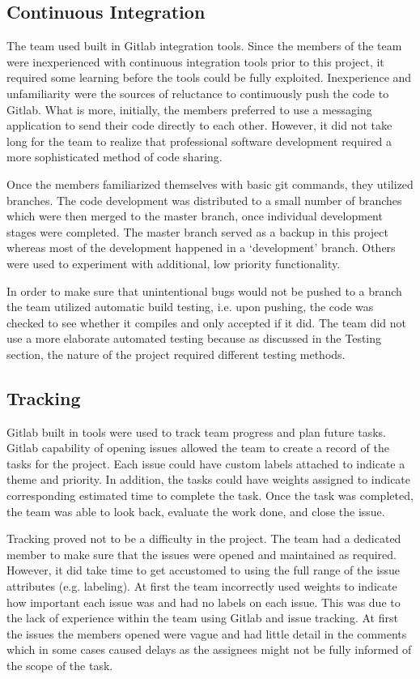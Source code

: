 \documentclass{l3proj}
\begin{document}
\subsection{Continuous Integration}
The team used built in Gitlab integration tools. Since the members of the team were inexperienced with continuous integration tools prior to this project, 
it required some learning before the tools could be fully exploited. Inexperience and unfamiliarity were the sources of reluctance to continuously push the 
code to Gitlab. What is more, initially, the members preferred to use a messaging application to send their code directly to each other. However, it did not 
take long for the team to realize that professional software development required a more sophisticated method of code sharing.

Once the members familiarized themselves with basic git commands, they utilized branches. The code development was distributed to a small number of branches 
which were then merged to the master branch, once individual development stages were completed. The master branch served as a backup in this project whereas 
most of the development happened in a ‘development' branch. Others were used to experiment with additional, low priority functionality.

In order to make sure that unintentional bugs would not be pushed to a branch the team utilized automatic build testing, i.e. upon pushing, the code was 
checked to see whether it compiles and only accepted if it did. The team did not use a more elaborate automated testing because as discussed in the Testing 
section, the nature of the project required different testing methods.

\subsection{Tracking}
Gitlab built in tools were used to track team progress and plan future tasks. Gitlab capability of opening issues allowed the team to create a record of the 
tasks for the project. Each issue could have custom labels attached to indicate a theme and priority. In addition, the tasks could have weights assigned to 
indicate corresponding estimated time to complete the task. Once the task was completed, the team was able to look back, evaluate the work done, and close the 
issue.

Tracking proved not to be a difficulty in the project. The team had a dedicated member to make sure that the issues were opened and maintained as required. 
However, it did take time to get accustomed to using the full range of the issue attributes (e.g. labeling). At first the team incorrectly used weights to indicate 
how important each issue was and had no labels on each issue. This was due to the lack of experience within the team using Gitlab and issue tracking. At first 
the issues the members opened were vague and had little detail in the comments which in some cases caused delays as the assignees might not be fully informed of the scope of the task.
 
\end{document}
